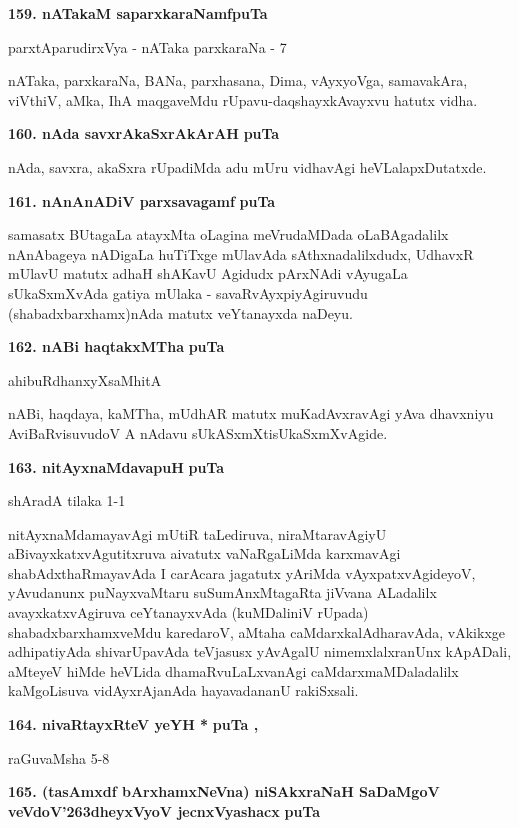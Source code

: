 \medskip
\noindent
\textbf{159. nATakaM saparxkaraNamf}\hfill{\bf puTa \pageref{241}}

\hfill{parxtAparudirxVya - nATaka parxkaraNa - 7}

\smallskip
nATaka, parxkaraNa, BANa, parxhasana, Dima, vAyxyoVga, samavakAra, viVthiV, aMka, IhA maqgaveMdu rUpavu-daqshayxkAvayxvu hatutx vidha.

\medskip
\noindent
\textbf{160. nAda savxrAkaSxrAkArAH} \hfill{\bf puTa \pageref{149b}}

\smallskip
nAda, savxra, akaSxra rUpadiMda adu mUru vidhavAgi heVLalapxDutatxde.


\medskip
\noindent
\textbf{161. nAnAnADiV parxsavagamf} \hfill{\bf puTa \pageref{155a}}

\smallskip
samasatx BUtagaLa atayxMta oLagina meVrudaMDada oLaBAgadalilx nAnAbageya nADigaLa huTiTxge mUlavAda sAthxnadalilxdudx, UdhavxR mUlavU matutx adhaH shAKavU Agidudx pArxNAdi vAyugaLa sUkaSxmXvAda gatiya mUlaka - savaRvAyxpiyAgiruvudu (shabadxbarxhamx)nAda matutx veYtanayxda naDeyu.

\eject

\noindent
\textbf{162. nABi haqtakxMTha} \hfill{\bf puTa \pageref{151e}}

\hfill{ahibuRdhanxyXsaMhitA}

\smallskip
nABi, haqdaya, kaMTha, mUdhAR matutx muKadAvxravAgi yAva dhavxniyu AviBaRvisuvudoV A nAdavu sUkASxmXtisUkaSxmXvAgide. 

\medskip
\noindent
\textbf{163. nitAyxnaMdavapuH} \hfill{\bf puTa \pageref{165}}

\hfill{shAradA tilaka 1-1}

\smallskip
nitAyxnaMdamayavAgi mUtiR taLediruva, niraMtaravAgiyU aBivayxkatxvAgutitxruva aivatutx vaNaRgaLiMda karxmavAgi shabAdxthaRmayavAda I carAcara jagatutx yAriMda vAyxpatxvAgideyoV, yAvudanunx puNayxvaMtaru suSumAnxMtagaRta \hbox{jiVvana} ALadalilx avayxkatxvAgiruva ceYtanayxvAda (kuMDaliniV rUpada) shabadxbarxhamxveMdu karedaroV, aMtaha caMdarxkalAdharavAda, vAkikxge adhipatiyAda shivarUpavAda teVjasusx yAvAgalU nimemxlalxranUnx kApADali, aMteyeV hiMde heVLida dhamaRvuLaLxvanAgi caMdarxmaMDaladalilx kaMgoLisuva vidAyxrAjanAda hayavadananU rakiSxsali.

\medskip
\noindent
\textbf{164. nivaRtayxRteV yeYH *} \hfill{\bf puTa \pageref{56c}, \pageref{57}}

\hfill{raGuvaMsha 5-8}

\medskip
\noindent
\textbf{165. (tasAmxdf bArxhamxNeVna) niSAkxraNaH SaDaMgoV veVdoV\char'263dheyxVyoV jecnxVyashacx} \hfill{\bf puTa \pageref{42a}}

